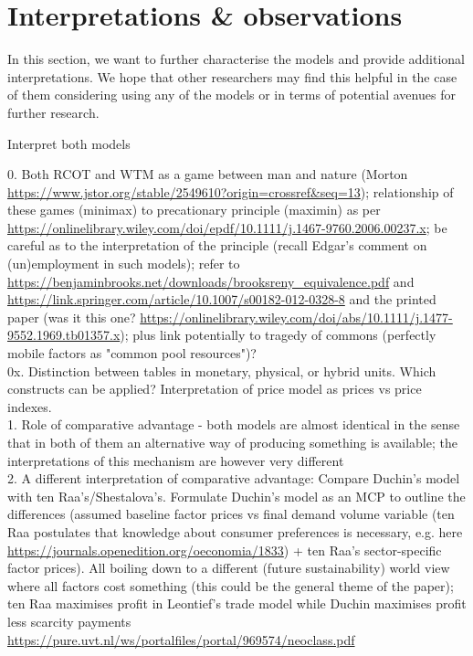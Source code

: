 \section{Interpretations \& observations}

In this section, we want to further characterise the models and provide additional interpretations. We hope that other researchers may find this helpful in the case of them considering using any of the models or in terms of potential avenues for further research.

Interpret both models

0. Both RCOT and WTM as a game between man and nature (Morton \url{https://www.jstor.org/stable/2549610?origin=crossref&seq=13}); relationship of these games (minimax) to precationary principle (maximin) as per \url{https://onlinelibrary.wiley.com/doi/epdf/10.1111/j.1467-9760.2006.00237.x}; be careful as to the interpretation of the principle (recall Edgar's comment on (un)employment in such models); refer to \url{https://benjaminbrooks.net/downloads/brooksreny_equivalence.pdf} and \url{https://link.springer.com/article/10.1007/s00182-012-0328-8} and the printed paper (was it this one? \url{https://onlinelibrary.wiley.com/doi/abs/10.1111/j.1477-9552.1969.tb01357.x}); plus link potentially to tragedy of commons (perfectly mobile factors as "common pool resources")? \\
0x. Distinction between tables in monetary, physical, or hybrid units. Which constructs can be applied? Interpretation of price model as prices vs price indexes.\\
1. Role of comparative advantage - both models are almost identical in the sense that in both of them an alternative way of producing something is available; the interpretations of this mechanism are however very different \\
2. A different interpretation of comparative advantage: Compare Duchin's model with ten Raa's/Shestalova's. Formulate Duchin's model as an MCP to outline the differences (assumed baseline factor prices vs final demand volume variable (ten Raa postulates that knowledge about consumer preferences is necessary, e.g. here \url{https://journals.openedition.org/oeconomia/1833}) + ten Raa's sector-specific factor prices). All boiling down to a different (future sustainability) world view where all factors cost something (this could be the general theme of the paper); ten Raa maximises profit in Leontief's trade model while Duchin maximises profit less scarcity payments \url{https://pure.uvt.nl/ws/portalfiles/portal/969574/neoclass.pdf}\\
